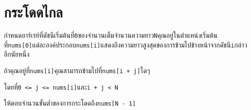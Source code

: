 \documentclass{article}
\begin{document}
\section*{กระโดดไกล}

กำหนดอาร์เรย์ที่ดัชนีเริ่มต้นที่\texttt{0}ของจำนวนเต็มจำนวนความยาว\texttt{N}คุณอยู่ในตำแหน่งเริ่มต้นที่\texttt{nums{[}0{]}}แต่ละองค์ประกอบ\texttt{nums{[}i{]}}แสดงถึงความยาวสูงสุดของการข้ามไปข้างหน้าจากดัชนี\texttt{i}กล่าวอีกนัยหนึ่ง

ถ้าคุณอยู่ที่\texttt{nums{[}i{]}}คุณสามารถข้ามไปที่\texttt{nums{[}i\ +\ j{]}}ใดๆ

โดยที่\texttt{0\ \textless{}=\ j\ \textless{}=\ nums{[}i{]}}และ\texttt{i\ +\ j\ \textless{}\ N}



ให้ตอบจำนวนขั้นต่ำของการกระโดดถึง\texttt{nums{[}N\ -\ 1{]}}
\end{document}

